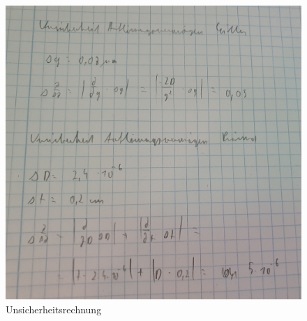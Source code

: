 \documentclass[12pt,a4paper,twoside]{article}
\begin{document}
\begin{figure}[H]
    \centering
    \includegraphics[width=1\linewidth]{nudes/uns1.jpg}
    \caption{Unsicherheitsrechnung}
    \label{fig:uns2}
\end{figure}
\end{document}
